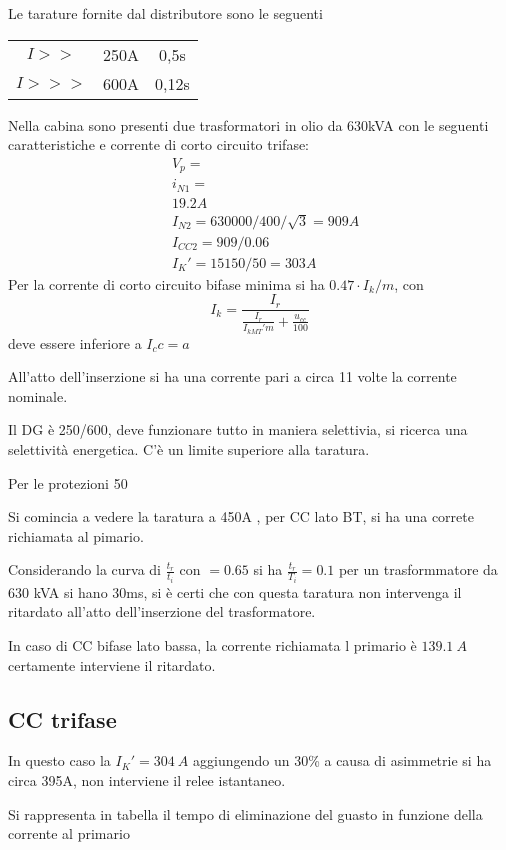 Le tarature fornite dal distributore sono le seguenti
\begin{table}[h]\centering
    \begin{tabular}{c c c}
        $I>>$  & 250A & 0,5s\\
        $I>>>$ & 600A & 0,12s
    \end{tabular}
\end{table}

Nella cabina sono presenti due trasformatori in olio da 630kVA con le seguenti caratteristiche e corrente di corto circuito trifase:
$$\begin{aligned}
    &V_p = \\
    &i_{N1} = \\
    &19.2 A \\
    &I_{N2} = 630000/400/\sqrt{3} = 909A \\
    &I_{CC2} = 909/0.06 \\
    &I_{K}' = 15150/50 = 303A
\end{aligned}
$$
Per la corrente di corto circuito bifase minima si ha $0.47\cdot I_k/m$, con
$$
I_k  = \frac{I_r}{\frac{I_r}{I_{kMT}'m}+ \frac{u_{cc}}{100}}
$$
deve essere inferiore a $I_cc=a $

All'atto dell'inserzione si ha una corrente pari a circa 11 volte la corrente nominale.

Il DG è 250/600, deve funzionare tutto in maniera selettivia, si ricerca una selettività energetica. C'è un limite superiore alla taratura. 

Per le protezioni 50

Si comincia a vedere la taratura a 450A , per CC lato BT, si ha una correte richiamata al pimario.


Considerando la curva di $\frac{t_r}{t_i}$ con $=0.65$ si ha $\frac{t_r}{T_i} = 0.1$ per un trasformmatore da 630 kVA si hano 30ms, si è certi che con questa taratura non intervenga il ritardato all'atto dell'inserzione del trasformatore.

In caso di CC bifase lato bassa, la corrente richiamata l primario è $139.1\ A$ certamente interviene il ritardato.

\subsection{CC trifase} In questo caso la $I_K' = 304\ A$ aggiungendo un 30\% a causa di asimmetrie si ha circa 395A, non interviene il relee istantaneo. 

Si rappresenta in tabella il tempo di eliminazione del guasto in funzione della corrente al primario

